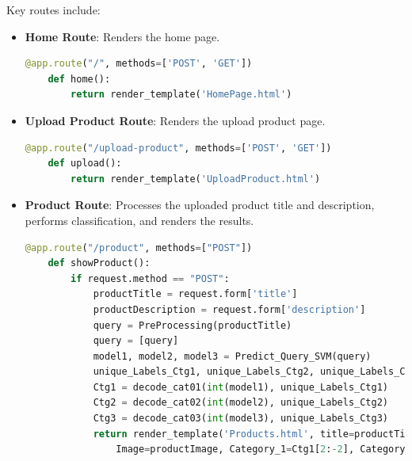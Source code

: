 \documentclass[10pt]{article}
\begin{document}
Key routes include:
\begin{itemize}
    \item \textbf{Home Route}: Renders the home page.
    \begin{lstlisting}[language=Python]
    @app.route("/", methods=['POST', 'GET'])
    def home():
        return render_template('HomePage.html')
    \end{lstlisting}
    
    \item \textbf{Upload Product Route}: Renders the upload product page.
    \begin{lstlisting}[language=Python]
    @app.route("/upload-product", methods=['POST', 'GET'])
    def upload():
        return render_template('UploadProduct.html')
    \end{lstlisting}
    
    \item \textbf{Product Route}: Processes the uploaded product title and description, performs classification, and renders the results.
    \begin{lstlisting}[language=Python]
    @app.route("/product", methods=["POST"])
    def showProduct():
        if request.method == "POST":
            productTitle = request.form['title']
            productDescription = request.form['description']
            query = PreProcessing(productTitle)
            query = [query]
            model1, model2, model3 = Predict_Query_SVM(query)
            unique_Labels_Ctg1, unique_Labels_Ctg2, unique_Labels_Ctg3 = Get_Unique_Labels()
            Ctg1 = decode_cat01(int(model1), unique_Labels_Ctg1)
            Ctg2 = decode_cat02(int(model2), unique_Labels_Ctg2)
            Ctg3 = decode_cat03(int(model3), unique_Labels_Ctg3)
            return render_template('Products.html', title=productTitle, description=productDescription, 
                Image=productImage, Category_1=Ctg1[2:-2], Category_2=Ctg2[2:-2], Category_3=Ctg3[2:-2])
    \end{lstlisting}
\end{itemize}
\end{document}
